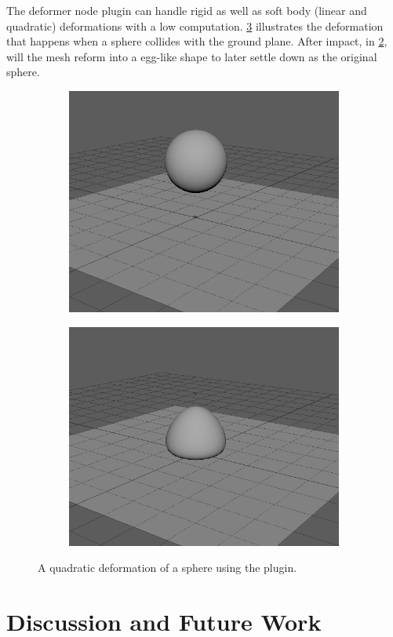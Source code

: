 The deformer node plugin can handle rigid as well as soft body (linear and quadratic) deformations with a low computation. \ref{fig:maya} illustrates the deformation that happens when a sphere collides with the ground plane. After impact, in \ref{fig:sfig2}, will the mesh reform into a egg-like shape to later settle down as the original sphere.

\begin{figure}
\begin{subfigure}{.3\textwidth}
  \centering
  \includegraphics[width=0.9\linewidth]{img/def1.png}
  \caption{}
  \label{fig:sfig1}
\end{subfigure}%
\begin{subfigure}{.3\textwidth}
  \centering
  \includegraphics[width=0.9\linewidth]{img/def2.png}
  \caption{}
  \label{fig:sfig2}
\end{subfigure}
\caption{A quadratic deformation of a sphere using the plugin.}
\label{fig:maya}
\end{figure}



\section{Discussion and Future Work}



\pagebreak



